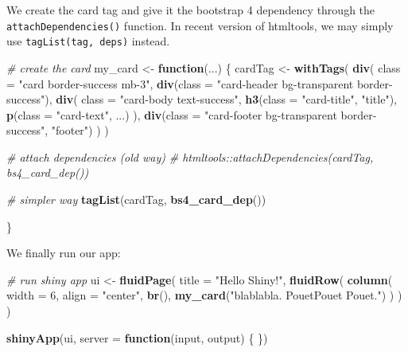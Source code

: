 \documentclass[]{book}
\newenvironment{Shaded}{\begin{snugshade}}{\end{snugshade}}
\newcommand{\CommentTok}[1]{\textcolor[rgb]{0.56,0.35,0.01}{\textit{#1}}}
\newcommand{\ControlFlowTok}[1]{\textcolor[rgb]{0.13,0.29,0.53}{\textbf{#1}}}
\newcommand{\DataTypeTok}[1]{\textcolor[rgb]{0.13,0.29,0.53}{#1}}
\newcommand{\DecValTok}[1]{\textcolor[rgb]{0.00,0.00,0.81}{#1}}
\newcommand{\KeywordTok}[1]{\textcolor[rgb]{0.13,0.29,0.53}{\textbf{#1}}}
\newcommand{\NormalTok}[1]{#1}
\newcommand{\StringTok}[1]{\textcolor[rgb]{0.31,0.60,0.02}{#1}}
\begin{document}
We create the card tag and give it the bootstrap 4 dependency through the \texttt{attachDependencies()} function. In recent version of htmltools, we may simply use
\texttt{tagList(tag,\ deps)} instead.

\begin{Shaded}
\begin{Highlighting}[]
\CommentTok{# create the card}
\NormalTok{my_card <-}\StringTok{ }\ControlFlowTok{function}\NormalTok{(...) \{}
\NormalTok{  cardTag <-}\StringTok{ }\KeywordTok{withTags}\NormalTok{(}
    \KeywordTok{div}\NormalTok{(}
      \DataTypeTok{class =} \StringTok{"card border-success mb-3"}\NormalTok{,}
      \KeywordTok{div}\NormalTok{(}\DataTypeTok{class =} \StringTok{"card-header bg-transparent border-success"}\NormalTok{),}
      \KeywordTok{div}\NormalTok{(}
        \DataTypeTok{class =} \StringTok{"card-body text-success"}\NormalTok{,}
        \KeywordTok{h3}\NormalTok{(}\DataTypeTok{class =} \StringTok{"card-title"}\NormalTok{, }\StringTok{"title"}\NormalTok{),}
        \KeywordTok{p}\NormalTok{(}\DataTypeTok{class =} \StringTok{"card-text"}\NormalTok{, ...)}
\NormalTok{      ),}
      \KeywordTok{div}\NormalTok{(}\DataTypeTok{class =} \StringTok{"card-footer bg-transparent border-success"}\NormalTok{, }\StringTok{"footer"}\NormalTok{)}
\NormalTok{    )}
\NormalTok{  )}
  
  \CommentTok{# attach dependencies (old way)}
  \CommentTok{# htmltools::attachDependencies(cardTag, bs4_card_dep())}
  
  \CommentTok{# simpler way}
  \KeywordTok{tagList}\NormalTok{(cardTag, }\KeywordTok{bs4_card_dep}\NormalTok{())}
  
\NormalTok{\}}
\end{Highlighting}
\end{Shaded}

We finally run our app:

\begin{Shaded}
\begin{Highlighting}[]
\CommentTok{# run shiny app }
\NormalTok{ui <-}\StringTok{ }\KeywordTok{fluidPage}\NormalTok{(}
  \DataTypeTok{title =} \StringTok{"Hello Shiny!"}\NormalTok{,}
  \KeywordTok{fluidRow}\NormalTok{(}
    \KeywordTok{column}\NormalTok{(}
      \DataTypeTok{width =} \DecValTok{6}\NormalTok{,}
      \DataTypeTok{align =} \StringTok{"center"}\NormalTok{,}
      \KeywordTok{br}\NormalTok{(),}
      \KeywordTok{my_card}\NormalTok{(}\StringTok{"blablabla. PouetPouet Pouet."}\NormalTok{)}
\NormalTok{    )}
\NormalTok{  )}
\NormalTok{)}

\KeywordTok{shinyApp}\NormalTok{(ui, }\DataTypeTok{server =} \ControlFlowTok{function}\NormalTok{(input, output) \{ \})}
\end{Highlighting}
\end{Shaded}
\end{document}
